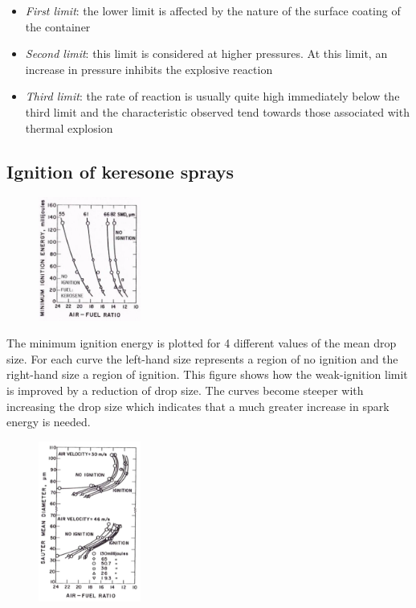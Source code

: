 \documentclass[12pt]{article}
\begin{document}
\begin{itemize}
    \item \textit{First limit}: the lower limit is affected by the nature of the surface coating of the container
    \item \textit{Second limit}: this limit is considered at higher pressures. At this limit, an increase in pressure inhibits the explosive reaction
    \item \textit{Third limit}: the rate of reaction is usually quite high immediately below the third limit and the characteristic observed tend towards those associated with thermal explosion
\end{itemize}

\subsection{Ignition of keresone sprays}

\begin{figure}[h!]
\centering
\includegraphics[width=0.3\textwidth]{figures/kerosene.png}
\end{figure}

The minimum ignition energy is plotted for 4 different values of the mean drop size. For each curve the left-hand size represents a region of no ignition and the right-hand size a region of ignition. This figure shows how the weak-ignition limit is improved by a reduction of drop size. The curves become steeper with increasing the drop size which indicates that a much greater increase in spark energy is needed.

\begin{figure}[h!]
\centering
\includegraphics[width=0.3\textwidth]{figures/kerosene2.png}
\end{figure}
\end{document}
